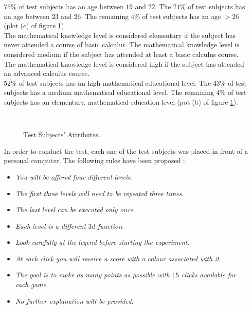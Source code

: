 $75\%$ of test subjects has an age between $19$ and $22$. The $21\%$ of test subjects has an age between $23$ and $26$. The remaining $4\%$ of test subjects has an age $> 26$ (plot (c) of figure \ref{fig:testSubjectsAttributes}). \\

The mathematical knowledge level is considered elementary if the subject has never attended a course of basic calculus. The mathematical knowledge level is considered medium if the subject has attended at least a basic calculus course. The mathematical knowledge level is considered high if the subject has attended an advanced calculus course. \\

$52\%$ of test subjects has an high mathematical educational level. The $43\%$ of test subjects has a medium mathematical educational level. The remaining $4\%$ of test subjects has an elementary, mathematical education level (pot (b) of figure \ref{fig:testSubjectsAttributes}). \\

\begin{figure}[h!]
	\begin{center}
		\\
	\end{center}
	\caption{
		Test Subjects' Attributes.
	}
	\label{fig:testSubjectsAttributes}
\end{figure}

In order to conduct the test, each one of the test subjects was placed in front of a personal computer. The following rules have been proposed :

\begin{itemize}
	\item \textit{You will be offered four different levels}.
	\item \textit{The first three levels will need to be repeated three times}.
	\item \textit{The last level can be executed only once}.
	\item \textit{Each level is a different $3d$-function}.
	\item \textit{Look carefully at the legend before starting the experiment}.
	\item \textit{At each click you will receive a score with a colour associated with it}.
	\item \textit{The goal is to make as many points as possible with $15$ clicks available for each game}.
	\item \textit{No further explanation will be provided}.
\end{itemize}

